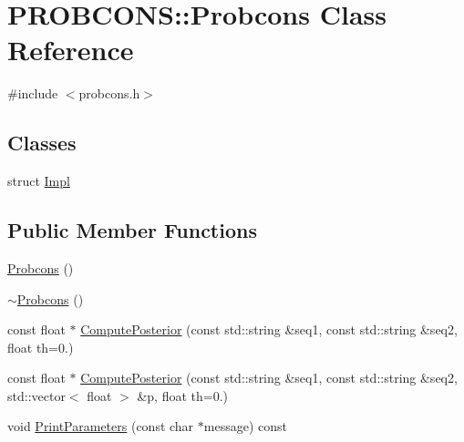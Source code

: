 \hypertarget{class_p_r_o_b_c_o_n_s_1_1_probcons}{\section{P\+R\+O\+B\+C\+O\+N\+S\+:\+:Probcons Class Reference}
\label{class_p_r_o_b_c_o_n_s_1_1_probcons}
}


{\ttfamily \#include $<$probcons.\+h$>$}

\subsection*{Classes}
\begin{DoxyCompactItemize}
\item 
struct \hyperlink{struct_p_r_o_b_c_o_n_s_1_1_probcons_1_1_impl}{Impl}
\end{DoxyCompactItemize}
\subsection*{Public Member Functions}
\begin{DoxyCompactItemize}
\item 
\hyperlink{class_p_r_o_b_c_o_n_s_1_1_probcons_ac223e94077c0abc61442496466c0c3af}{Probcons} ()
\item 
\hyperlink{class_p_r_o_b_c_o_n_s_1_1_probcons_a58de299b78c539f04b54b22bb8e406d3}{$\sim$\+Probcons} ()
\item 
const float $\ast$ \hyperlink{class_p_r_o_b_c_o_n_s_1_1_probcons_a61a2ebb7c173114f63499608e8ccf481}{Compute\+Posterior} (const std\+::string \&seq1, const std\+::string \&seq2, float th=0.)
\item 
const float $\ast$ \hyperlink{class_p_r_o_b_c_o_n_s_1_1_probcons_aec5f17e3df4cbc788e69e85de35e7cb5}{Compute\+Posterior} (const std\+::string \&seq1, const std\+::string \&seq2, std\+::vector$<$ float $>$ \&p, float th=0.)
\item 
void \hyperlink{class_p_r_o_b_c_o_n_s_1_1_probcons_aba4729d2c1968bb7696ee5ead2bf770e}{Print\+Parameters} (const char $\ast$message) const 
\end{DoxyCompactItemize}


